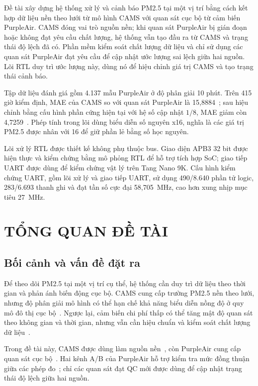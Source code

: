 \documentclass[a4paper,oneside,openany]{extreport}
\begin{document}
Đề tài xây dựng hệ thống xử lý và cảnh báo PM2.5 tại một vị trí bằng cách kết hợp dữ liệu nền theo lưới từ mô hình CAMS với quan sát cục bộ từ cảm biến PurpleAir. CAMS đóng vai trò nguồn nền; khi quan sát PurpleAir bị gián đoạn hoặc không đạt yêu cầu chất lượng, hệ thống vẫn tạo đầu ra từ CAMS và trạng thái độ lệch đã có. Phần mềm kiểm soát chất lượng dữ liệu và chỉ sử dụng các quan sát PurpleAir đạt yêu cầu để cập nhật ước lượng sai lệch giữa hai nguồn. Lõi RTL duy trì ước lượng này, dùng nó để hiệu chỉnh giá trị CAMS và tạo trạng thái cảnh báo.

Tập dữ liệu đánh giá gồm 4.137 mẫu PurpleAir ở độ phân giải 10 phút. Trên 415 giờ kiểm định, MAE của CAMS so với quan sát PurpleAir là 15,8884~\pmunit{}; sau hiệu chỉnh bằng cấu hình phần cứng hiện tại với hệ số cập nhật $1/8$, MAE giảm còn 4,7259~\pmunit{}. Phép tính trong lõi dùng biểu diễn số nguyên x16, nghĩa là các giá trị PM2.5 được nhân với 16 để giữ phần lẻ bằng số học nguyên.

Lõi xử lý RTL được thiết kế không phụ thuộc bus. Giao diện APB3 32 bit được hiện thực và kiểm chứng bằng mô phỏng RTL để hỗ trợ tích hợp SoC; giao tiếp UART được dùng để kiểm chứng vật lý trên Tang Nano 9K. Cấu hình kiểm chứng UART, gồm lõi xử lý và giao tiếp UART, sử dụng 490/8.640 phần tử logic, 283/6.693 thanh ghi và đạt tần số cực đại 58,705~MHz, cao hơn xung nhịp mục tiêu 27~MHz.
\chapter{TỔNG QUAN ĐỀ TÀI}

\section{Bối cảnh và vấn đề đặt ra}
Để theo dõi PM2.5 tại một vị trí cụ thể, hệ thống cần duy trì dữ liệu theo thời gian và phản ánh biến động cục bộ. CAMS cung cấp trường PM2.5 nền theo lưới, nhưng độ phân giải mô hình có thể hạn chế khả năng biểu diễn nồng độ ở quy mô đô thị cục bộ~\cite{eskes2024}. Ngược lại, cảm biến chi phí thấp có thể tăng mật độ quan sát theo không gian và thời gian, nhưng vẫn cần hiệu chuẩn và kiểm soát chất lượng dữ liệu~\cite{morawska2018}.

Trong đề tài này, CAMS được dùng làm nguồn nền~\cite{ecmwf_cams}, còn PurpleAir cung cấp quan sát cục bộ~\cite{purpleair_api}. Hai kênh A/B của PurpleAir hỗ trợ kiểm tra mức đồng thuận giữa các phép đo~\cite{barkjohn2021}; chỉ các quan sát đạt QC mới được dùng để cập nhật trạng thái độ lệch giữa hai nguồn.
\end{document}
